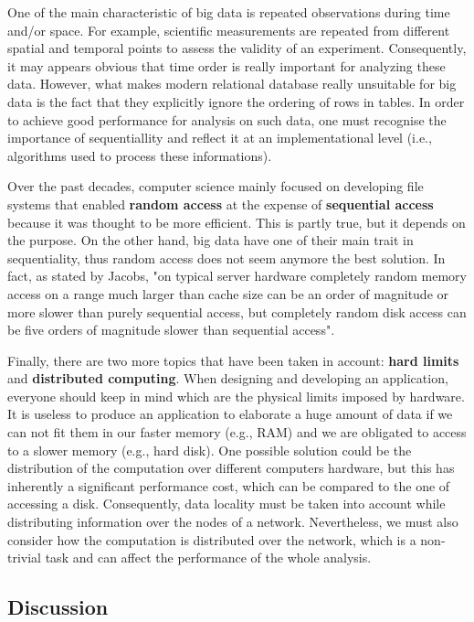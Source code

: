 \documentclass[a4paper]{IEEEtran}
\begin{document}
One of the main characteristic of big data is repeated observations during time and/or space. For example, scientific measurements are repeated from different spatial and temporal points to assess the validity of an experiment. Consequently, it may appears obvious that time order is really important for analyzing these data. However, what makes modern relational database really unsuitable for big data is the fact that they explicitly ignore the ordering of rows in tables. In order to achieve good performance for analysis on such data, one must recognise the importance of sequentiallity and reflect it at an implementational level (i.e., algorithms used to process these informations). 

Over the past decades, computer science mainly focused on developing file systems that enabled \textbf{random access} at the expense of \textbf{sequential access} because it was thought to be more efficient. This is partly true, but it depends on the purpose. On the other hand, big data have one of their main trait in sequentiality, thus random access does not seem anymore the best solution. In fact, as stated by Jacobs, "on typical server hardware completely random memory access on a range much larger than cache size can be an order of magnitude or more slower than purely sequential access, but completely random disk access can be five orders of magnitude slower than sequential access".

Finally, there are two more topics that have been taken in account: \textbf{hard limits} and \textbf{distributed computing}. When designing and developing an application, everyone should keep in mind which are the physical limits imposed by hardware. It is useless to produce an application to elaborate a huge amount of data if we can not fit them in our faster memory (e.g., RAM) and we are obligated to access to a slower memory (e.g., hard disk). One possible solution could be the distribution of the computation over different computers hardware, but this has inherently a significant performance cost, which can be compared to the one of accessing a disk. Consequently, data locality must be taken into account while distributing information over the nodes of a network. Nevertheless, we must also consider how the computation is distributed over the network, which is a non-trivial task and can affect the performance of the whole analysis.

\subsection{Discussion}
\end{document}
